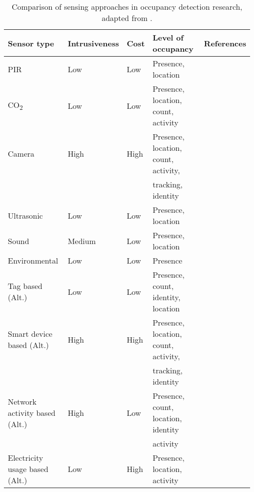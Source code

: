\begin{table}[]
\centering
\begin{adjustbox}{max width=0.95\textwidth}
\begin{tabular}{lllll}
\hline
\textbf{Sensor type}           & \textbf{Intrusiveness} & \textbf{Cost} & \textbf{Level of occupancy}                  & \textbf{References} \\ \hline
PIR                            & Low           & Low  & Presence, location                   & \cite{Naray15PIR_loc, PIR_only_behav_ext,PIR_only_behav_ext_mcu,PIR_tracking_yang2019new}          \\
CO\textsubscript{2}                            & Low           & Low  & Presence, location, count, activity  &  \cite{Yang12multisensor_aud,Newsh10PIR_CO2, CALI2015co2_anal}          \\
Camera                         & High          & High & Presence, location, count, activity, &  \cite{SHIH2014camera}          \\
                               &               &      & \hspace{0.5cm}tracking, identity     &            \\
Ultrasonic                     & Low           & Low  & Presence, location                   &  \cite{Shih16ultrason}           \\
Sound                          & Medium        & Low  & Presence, location                   & 
\cite{Aud_crowd_entropy_Chen, Aud_crowd_ste_huang, aud_gm_hmm, Yang12multisensor_aud}           \\
Environmental                  & Low           & Low  & Presence                             &   \cite{Yang12multisensor_aud}         \\
Tag based (Alt.)               & Low           & Low  & Presence, count, identity, location  &  \cite{Li16rfid_occ}           \\
Smart device based (Alt.)      & High          & High & Presence, location, count, activity, &   \cite{Gupta13WIFI_occ}         \\
                               &               &      & \hspace{0.5cm}tracking, identity     &            \\
Network activity based (Alt.)  & High          & Low  & Presence, count, location, identity  &   \cite{Newsh10PIR_CO2}         \\
                               &               &      & \hspace{0.5cm}activity               &            \\
Electricity usage based (Alt.) & Low           & High & Presence, location, activity         &   \cite{Newsh10PIR_CO2}           \\ \hline
\end{tabular}
\end{adjustbox}
\caption{Comparison of sensing approaches in occupancy detection research, adapted from \cite{build_occ_det_tech_review_sensor}.}
\label{tab:comp_sensor}
\end{table}



